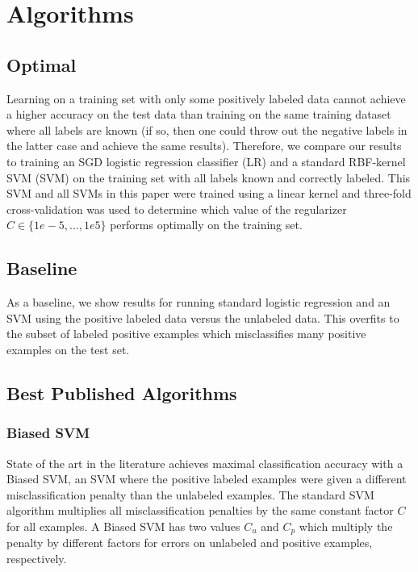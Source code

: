 \documentclass{article}
\begin{document}
\section{Algorithms}

\subsection{Optimal}

Learning on a training set with only some positively labeled data cannot achieve a higher accuracy on the test data than training on the same training dataset where all labels are known (if so, then one could throw out the negative labels in the latter case and achieve the same results).  Therefore, we compare our results to training an SGD logistic regression classifier (LR) and a standard RBF-kernel SVM (SVM) on the training set with all labels known and correctly labeled.  This SVM and all SVMs in this paper were trained using a linear kernel and three-fold cross-validation was used to determine which value of the regularizer $C \in \{1e-5, ..., 1e5\}$ performs optimally on the training set.

\subsection{Baseline}

As a baseline, we show results for running standard logistic regression and an SVM using the positive labeled data versus the unlabeled data.  This overfits to the subset of labeled positive examples which misclassifies many positive examples on the test set.

\subsection{Best Published Algorithms}

\subsubsection{Biased SVM}

State of the art in the literature \cite{elkan08} achieves maximal classification accuracy with a Biased SVM, an SVM where the positive labeled examples were given a different misclassification penalty than the unlabeled examples.  The standard SVM algorithm multiplies all misclassification penalties by the same constant factor $C$ for all examples. A Biased SVM has two values $C_u$ and $C_p$ which multiply the penalty by different factors for errors on unlabeled and positive examples, respectively.
\end{document}
